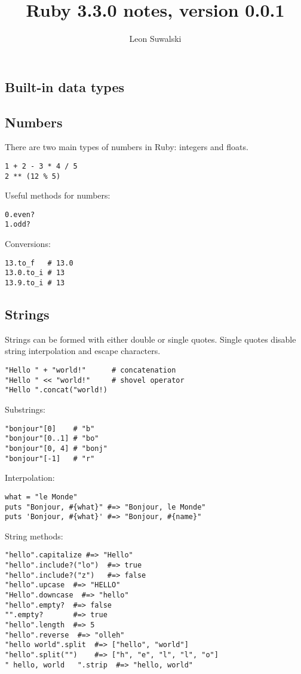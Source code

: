 \documentclass{charun}
\title{Ruby 3.3.0 notes, version 0.0.1}
\author{Leon Suwalski}
\begin{document}
\begin{multicols*}{2}
\maketitle
\raggedright

\section{Built-in data types}
\subsection{Numbers}
There are two main types of numbers in Ruby: integers and floats.
\begin{verbatim}
1 + 2 - 3 * 4 / 5
2 ** (12 % 5)
\end{verbatim}

Useful methods for numbers:
\begin{verbatim}
0.even?
1.odd?
\end{verbatim}

Conversions:
\begin{verbatim}
13.to_f   # 13.0
13.0.to_i # 13
13.9.to_i # 13
\end{verbatim}

\subsection{Strings}
Strings can be formed with either double or single quotes.
Single quotes disable string interpolation and escape characters.
\begin{verbatim}
"Hello " + "world!"      # concatenation
"Hello " << "world!"     # shovel operator
"Hello ".concat("world!)
\end{verbatim}

Substrings:
\begin{verbatim}
"bonjour"[0]    # "b"
"bonjour"[0..1] # "bo"
"bonjour"[0, 4] # "bonj"
"bonjour"[-1]   # "r"
\end{verbatim}

Interpolation:
\begin{verbatim}
what = "le Monde"
puts "Bonjour, #{what}" #=> "Bonjour, le Monde"
puts 'Bonjour, #{what}' #=> "Bonjour, #{name}"
\end{verbatim}

String methods:
\begin{verbatim}
"hello".capitalize #=> "Hello"
"hello".include?("lo")  #=> true
"hello".include?("z")   #=> false
"hello".upcase  #=> "HELLO"
"Hello".downcase  #=> "hello"
"hello".empty?  #=> false
"".empty?       #=> true
"hello".length  #=> 5
"hello".reverse  #=> "olleh"
"hello world".split  #=> ["hello", "world"]
"hello".split("")    #=> ["h", "e", "l", "l", "o"]
" hello, world   ".strip  #=> "hello, world"
\end{verbatim}


\end{multicols*}
\end{document}
